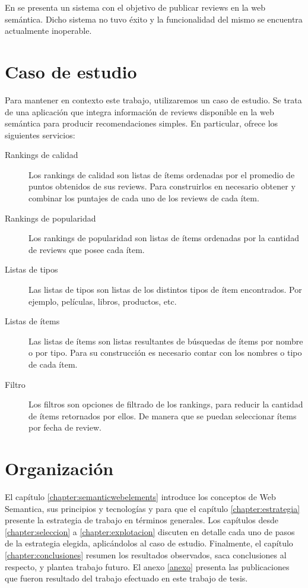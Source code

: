 En \cite{Heath2006} se presenta un sistema con el objetivo de publicar reviews en la web semántica. Dicho sistema no tuvo éxito
y la funcionalidad del mismo se encuentra actualmente inoperable.

\section{Caso de estudio}
\label{section:caso-de-estudio}
Para mantener en contexto este trabajo, utilizaremos un caso de estudio. Se trata de una aplicación que integra información de reviews disponible en la web semántica para producir recomendaciones simples. En particular, ofrece los siguientes servicios: 

\begin{description}
\item[Rankings de calidad ] Los rankings de calidad son listas de ítems ordenadas por el promedio de puntos 
obtenidos de sus reviews. Para construirlos en necesario obtener y combinar los puntajes de cada uno
de los reviews de cada ítem.
\item[Rankings de popularidad] Los rankings de popularidad son listas de ítems ordenadas por la cantidad
de reviews que posee cada ítem.
\item[Listas de tipos] Las listas de tipos son listas de los distintos tipos de ítem encontrados. 
Por ejemplo, películas, libros, productos, etc.
\item[Listas de ítems] Las listas de ítems son listas resultantes de búsquedas de ítems por nombre o por tipo. 
Para su construcción es necesario contar con los nombres o tipo de cada ítem.
\item[Filtro] Los filtros son opciones de filtrado de los rankings, para reducir la cantidad 
de ítems retornados por ellos. De manera que se puedan seleccionar ítems por fecha de review.
 
\end{description}


\section{Organización}
\label{section:organizacion}

 El capítulo \ref{chapter:semanticwebelements} introduce los conceptos de Web Semantica, sus principios y tecnologías y para que el capítulo \ref{chapter:estrategia} presente la estrategia de trabajo en términos generales. Los capítulos desde \ref{chapter:seleccion} a \ref{chapter:explotacion} discuten en detalle cada uno de pasos de la estrategia elegida, aplicándolos al caso de estudio. Finalmente, el capítulo \ref{chapter:conclusiones} resumen los resultados observados, saca conclusiones al respecto, y plantea trabajo futuro. El anexo \ref{anexo} presenta las publicaciones que fueron resultado del trabajo efectuado en este trabajo de tesis. 



